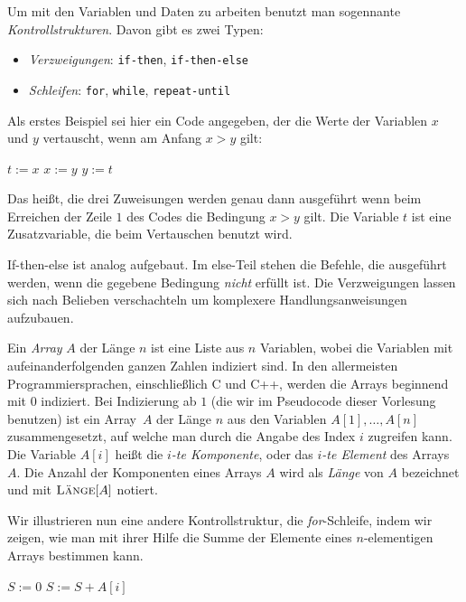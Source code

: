 \begin{bem}
Um mit den Variablen und Daten zu arbeiten benutzt man sogennante \emph{Kontrollstrukturen}. Davon gibt es zwei Typen:
\begin{itemize}
	\item \emph{Verzweigungen}: \texttt{if-then}, \texttt{if-then-else}
	\item \emph{Schleifen}: \texttt{for}, \texttt{while}, \texttt{repeat-until}
\end{itemize}
\end{bem} 

\begin{bem} 
Als erstes Beispiel sei hier ein Code angegeben, der die Werte der Variablen $x$ und $y$ vertauscht, wenn am Anfang $x>y$ gilt: 
\begin{center}
	\begin{algorithmic}[1]
		\STATE $t:=x$
		\STATE $x:=y$
		\STATE $y:=t$
		\ENDIF
	\end{algorithmic}
\end{center}
Das heißt, die drei Zuweisungen werden genau dann ausgeführt wenn beim Erreichen der Zeile $1$ des Codes die Bedingung $x>y$ gilt. Die Variable $t$ ist eine Zusatzvariable, die beim Vertauschen benutzt wird. 

If-then-else ist analog aufgebaut. Im else-Teil stehen die Befehle, die ausgeführt werden, wenn die gegebene Bedingung \emph{nicht} erfüllt ist. 
Die Verzweigungen lassen sich nach Belieben verschachteln um komplexere Handlungsanweisungen aufzubauen.
\end{bem} 

\begin{bem} 
Ein \emph{Array} $A$ der Länge $n$ ist eine Liste aus $n$ Variablen, wobei die Variablen mit aufeinanderfolgenden ganzen Zahlen indiziert sind. In den allermeisten Programmiersprachen, einschließlich C und C++, werden die Arrays beginnend mit $0$ indiziert. Bei Indizierung ab $1$ (die wir im Pseudocode dieser Vorlesung benutzen) ist ein Array~$A$ der Länge $n$ aus den Variablen $A[1],\ldots,A[n]$ zusammengesetzt, auf welche man durch die Angabe des Index $i$ zugreifen kann. Die Variable $A[i]$ heißt die \emph{$i$-te Komponente}, oder das \emph{$i$-te Element} des Arrays $A$. Die Anzahl der Komponenten eines Arrays $A$ wird als \emph{Länge} von $A$ bezeichnet und mit $\mathop{\text{\textsc{L\"ange}}}[A]$ notiert.
\end{bem} 

\begin{bem} 
Wir illustrieren nun eine andere Kontrollstruktur, die \emph{for}-Schleife, indem wir zeigen, wie man mit ihrer Hilfe die Summe der Elemente eines $n$-elementigen Arrays bestimmen kann. 

\begin{center}
	\begin{algorithmic}[1]
		\STATE $S:=0$
		\STATE $S:=S+A[i]$
		\ENDFOR
	\end{algorithmic}
\end{center}
\end{bem} 

